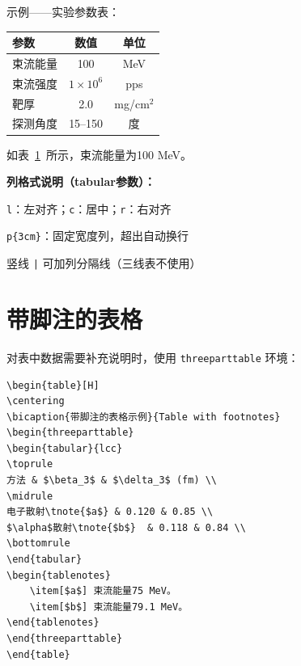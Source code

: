 示例——实验参数表：

\begin{table}[H]
\centering
{}
\label{tab:beam}
\begin{tabular}{lcc}
\toprule
参数 & 数值 & 单位 \\
\midrule
束流能量 & 100 & MeV \\
束流强度 & $1 \times 10^6$ & pps \\
靶厚 & 2.0 & mg/cm$^2$ \\
探测角度 & 15--150 & 度 \\
\bottomrule
\end{tabular}
\end{table}

如表~\ref{tab:beam}~所示，束流能量为100 MeV。

\textbf{列格式说明（tabular参数）：}
\begin{compactitem}
    \item \texttt{l}：左对齐；\texttt{c}：居中；\texttt{r}：右对齐
    \item \texttt{p\{3cm\}}：固定宽度列，超出自动换行
    \item 竖线 \verb+|+ 可加列分隔线（三线表不使用）
\end{compactitem}

\section{带脚注的表格}

对表中数据需要补充说明时，使用 \texttt{threeparttable} 环境：

\begin{verbatim}
\begin{table}[H]
\centering
\bicaption{带脚注的表格示例}{Table with footnotes}
\begin{threeparttable}
\begin{tabular}{lcc}
\toprule
方法 & $\beta_3$ & $\delta_3$ (fm) \\
\midrule
电子散射\tnote{$a$} & 0.120 & 0.85 \\
$\alpha$散射\tnote{$b$}  & 0.118 & 0.84 \\
\bottomrule
\end{tabular}
\begin{tablenotes}
    \item[$a$] 束流能量75 MeV。
    \item[$b$] 束流能量79.1 MeV。
\end{tablenotes}
\end{threeparttable}
\end{table}
\end{verbatim}

